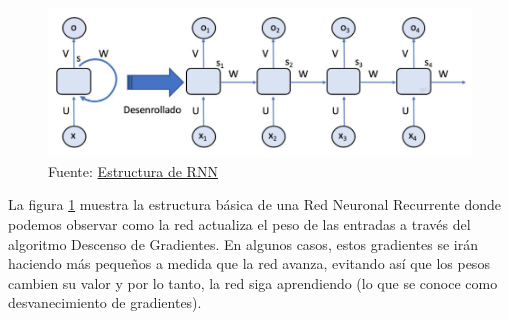 \documentclass[11pt,a4paper,spanish]{book}
\begin{document}
	\begin{figure}[H]
		\centering
		\includegraphics[scale=0.30]{rnn_structure.JPG} 
		\caption{Fuente:  \href{http://personal.cimat.mx:8181/~mrivera/cursos/aprendizaje_profundo/RNN_LTSM/introduccion_rnn.html}{Estructura de RNN}}
		\label{fig:rnn_structure}
	\end{figure}
	
	La figura \ref{fig:rnn_structure} muestra la estructura básica de una Red Neuronal Recurrente donde podemos observar como la red actualiza el peso de las entradas a través del algoritmo Descenso de Gradientes. En algunos casos, estos gradientes se irán haciendo más pequeños a medida que la red avanza, evitando así que los pesos cambien su valor y por lo tanto, la red siga aprendiendo (lo que se conoce como desvanecimiento de gradientes). 
	
\end{document}
